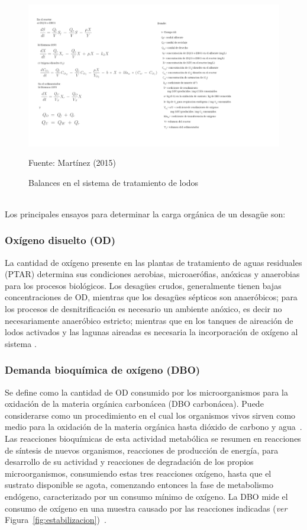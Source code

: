 	\begin{figure}[!h]
		\centering
		\includegraphics[scale=0.4]{Ecuaciones.png}
		\caption{Balances en el sistema de tratamiento de lodos}
		\label{fig:ecuaciones}
		\small{Fuente: Martínez (2015)}
	\end{figure}
\\Los principales ensayos para determinar la carga orgánica de un desagüe son: 
\subsubsection*{Oxígeno disuelto (OD)}
La cantidad de oxígeno presente en las plantas de tratamiento de aguas residuales (PTAR) determina sus condiciones aerobias, microaerófias, anóxicas y anaerobias para los procesos biológicos. Los desagües crudos, generalmente tienen bajas concentraciones de OD, mientras que los desagües sépticos son anaeróbicos; para los procesos de desnitrificación es necesario un ambiente anóxico, es decir no necesariamente anaeróbico estricto; mientras que en los tanques de aireación de lodos activados y las lagunas aireadas es necesaria la incorporación de oxígeno al sistema \emph{\citep{carreno17}}.
\subsubsection*{Demanda bioquímica de oxígeno (DBO)}
Se define como la cantidad de OD consumido por los microorganismos para la oxidación de la materia orgánica carbonácea (DBO carbonácea). Puede considerarse como un procedimiento en el cual los organismos vivos sirven como medio para la oxidación de la materia orgánica hasta dióxido de carbono y agua~\emph{\citep{carreno17}}.\\
Las reacciones bioquímicas de esta actividad metabólica se resumen en reacciones de síntesis de nuevos organismos, reacciones de producción de energía, para desarrollo de su actividad y reacciones de degradación de los propios microorganismos, consumiendo estas tres reacciones oxígeno, hasta que el sustrato disponible se agota, comenzando entonces la fase de metabolismo endógeno, caracterizado por un consumo mínimo de oxígeno. La DBO mide el consumo de oxígeno en una muestra causado por las reacciones indicadas (\emph{ver} Figura~\ref{fig:estabilizacion})~\emph{\citep{manuel13}}.
